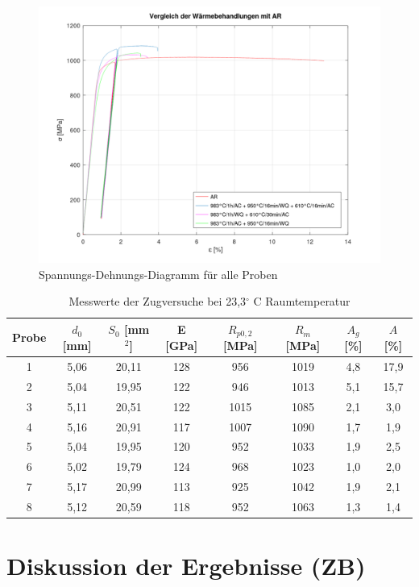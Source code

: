 \begin{figure}
	\centering
	\includegraphics[width=0.7\linewidth]{./Bilder/Vergleich aller Proben}
	\caption{Spannungs-Dehnungs-Diagramm für alle Proben}
	\label{fig:vergleich-alle-proben}
\end{figure}



\begin{table}[h]
	\centering
	\begin{tabular}{|c|c|c|c|c|c|c|c|}
		\hline
		Probe & $d_0$ [mm] & $S_0$ [mm$^2$] & E [GPa] & $R_{p0,2}$ [MPa]& $R_m$ [MPa]& $A_g$ [\%]& $A$ [\%]\\
		\hline
		1 & 5,06 & 20,11 & 128 & 956 & 1019&4,8&17,9 \\
		\hline
		2 &5,04&19,95&122&946&1013&5,1&15,7\\
		\hline
		3 & 5,11&20,51& 122&1015&1085&2,1&3,0\\
		\hline
		4 &5,16& 20,91& 117 & 1007& 1090& 1,7&  1,9 \\
		\hline
		5&5,04 &19,95& 120& 952& 1033& 1,9 &2,5\\
		\hline
		6 &5,02& 19,79& 124& 968& 1023 &1,0 & 2,0\\
		\hline
		7&5,17& 20,99& 113& 925& 1042& 1,9& 2,1\\
		\hline
		8 & 5,12 & 20,59 & 118 & 952 & 1063 & 1,3 & 1,4\\
		\hline
	\end{tabular}
	\caption{Messwerte der Zugversuche bei 23,3$^\circ$ C Raumtemperatur}
	\label{tab:zugversuche}
	
\end{table}

\section{Diskussion der Ergebnisse (ZB)}

